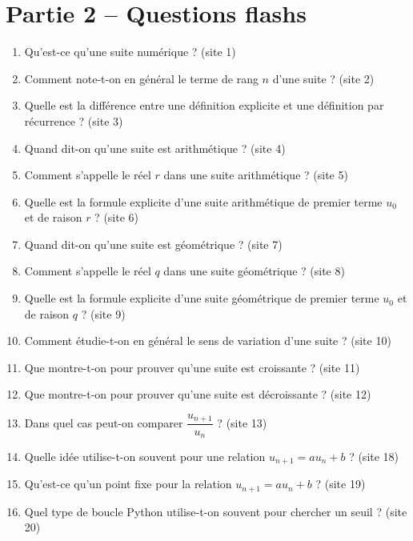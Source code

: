 \documentclass[11pt,a4paper]{article}
\newcommand{\origine}[1]{ {\scriptsize\textcolor{bleufonce}{(site #1)}}}
\newcounter{question}
\newenvironment{blocquestions}[1]{%
  \begin{tcolorbox}[enhanced,breakable,colback=bleuclair,colframe=bleufonce,boxrule=0.6pt,arc=2mm,left=2mm,right=2mm,top=2mm,bottom=1.5mm,title={\bfseries #1},coltitle=white,colbacktitle=bleufonce,before skip=3mm,after skip=3mm, fontupper=\large]
  \large
  \begin{enumerate}[leftmargin=*,label=\textbf{\arabic*.},itemsep=0.85em,topsep=0.5em]
  \setcounter{enumi}{\value{question}}
}{%
  \setcounter{question}{\value{enumi}}
  \end{enumerate}
  \end{tcolorbox}
}
\begin{document}
\section*{Partie 2 -- Questions flashs}
\setcounter{question}{0}
\begin{blocquestions}{A. Vocabulaire et formules de base}
  \item Qu'est-ce qu'une suite numérique ? \origine{1}
  \item Comment note-t-on en général le terme de rang \(n\) d'une suite ? \origine{2}
  \item Quelle est la différence entre une définition explicite et une définition par récurrence ? \origine{3}
  \item Quand dit-on qu'une suite est arithmétique ? \origine{4}
  \item Comment s'appelle le réel \(r\) dans une suite arithmétique ? \origine{5}
  \item Quelle est la formule explicite d'une suite arithmétique de premier terme \(u_0\) et de raison \(r\) ? \origine{6}
  \item Quand dit-on qu'une suite est géométrique ? \origine{7}
  \item Comment s'appelle le réel \(q\) dans une suite géométrique ? \origine{8}
  \item Quelle est la formule explicite d'une suite géométrique de premier terme \(u_0\) et de raison \(q\) ? \origine{9}
  \item Comment étudie-t-on en général le sens de variation d'une suite ? \origine{10}
  \item Que montre-t-on pour prouver qu'une suite est croissante ? \origine{11}
  \item Que montre-t-on pour prouver qu'une suite est décroissante ? \origine{12}
  \item Dans quel cas peut-on comparer \(\dfrac{u_{n+1}}{u_n}\) ? \origine{13}
  \item Quelle idée utilise-t-on souvent pour une relation \(u_{n+1}=a u_n+b\) ? \origine{18}
  \item Qu'est-ce qu'un point fixe pour la relation \(u_{n+1}=a u_n+b\) ? \origine{19}
  \item Quel type de boucle Python utilise-t-on souvent pour chercher un seuil ? \origine{20}
\end{blocquestions}
\end{document}

